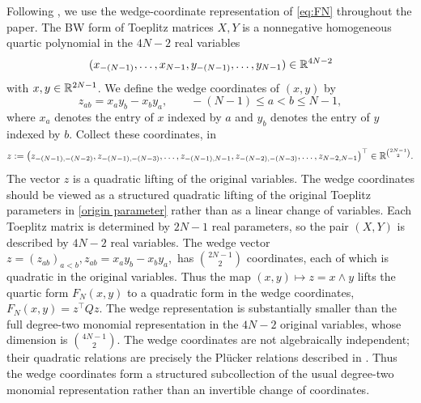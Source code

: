 Following \cite[Section~2]{laszlo2012}, we use the wedge-coordinate representation of \eqref{eq:FN} throughout the paper. The BW form of Toeplitz matrices $X,Y$ is a nonnegative homogeneous quartic polynomial in the $4N-2$ real variables
\begin{equation}
    \label{origin parameter}
(x_{-(N-1)},\ldots,x_{N-1},y_{-(N-1)},\ldots,y_{N-1}) \in\mathbb{R}^{4N-2} 
\end{equation}
with $x,y\in\mathbb{R}^{2N-1}$. 
We define the wedge coordinates of $(x,y)$ by
\begin{equation}
z_{ab}=x_ay_b-x_by_a,\qquad -(N-1)\le a<b\le N-1,
    \label{wedge coordinate}
\end{equation}
where $x_a$ denotes the entry of $x$ indexed by $a$ and $y_b$ denotes the entry of $y$ indexed by $b$. Collect these coordinates, in \begin{equation}
z:=\bigl(z_{-(N-1),-(N-2)},z_{-(N-1),-(N-3)},\ldots,z_{-(N-1),N-1},
z_{-(N-2),-(N-3)},\ldots,z_{N-2,N-1}\bigr)^\top
\in\mathbb{R}^{\binom{2N-1}{2}}.
\end{equation}
The vector $z$ is a quadratic lifting of the original variables.  
The wedge coordinates should be viewed as a structured quadratic lifting of the original Toeplitz parameters in \eqref{origin parameter} rather than as a linear change of variables.  Each Toeplitz matrix is determined by $2N-1$ real parameters, so the pair $(X,Y)$ is described by $4N-2$ real variables.  The wedge vector
$
z=(z_{ab})_{a<b}, 
z_{ab}=x_ay_b-x_by_a,
$
has
$
\binom{2N-1}{2}
$
coordinates, each of which is quadratic in the original variables.  Thus the map
$
(x,y)\mapsto z=x\wedge y
$
lifts the quartic form $F_N(x,y)$ to a quadratic form in the wedge coordinates,
$
F_N(x,y)=z^\top Qz.
$
The wedge representation is substantially smaller than the full degree-two monomial representation in the $4N-2$ original variables, whose dimension is
$
\binom{4N-1}{2}.
$
The wedge coordinates are not algebraically independent; their quadratic relations are precisely the Pl\"ucker relations described in .  Thus the wedge coordinates form a structured subcollection of the usual degree-two monomial representation rather than an invertible change of coordinates.



